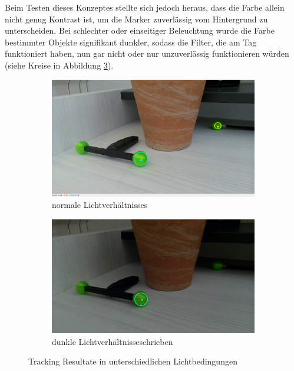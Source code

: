 \documentclass[12pt, ngerman]{article}
\begin{document}
Beim Testen dieses Konzeptes stellte sich jedoch heraus, dass die Farbe allein nicht genug Kontrast ist, um die Marker zuverlässig vom Hintergrund zu unterscheiden. Bei schlechter oder einseitiger Beleuchtung wurde die Farbe bestimmter Objekte signifikant dunkler, sodass die Filter, die am Tag funktioniert haben, nun gar nicht oder nur unzuverlässig funktionieren würden (siehe Kreise in Abbildung \ref{Abb: Lichtbedingungen}).  

\begin{figure}[htbp!]
  \centering
  \begin{subfigure}[t]{0.45\textwidth}
      \centering
      \includegraphics[width=\textwidth]{2d-normal.jpg}
      \caption{normale Lichtverhältnisses}
      \label{Abb: 2d-normal}
  \end{subfigure}
  \hfill
  \begin{subfigure}[t]{0.45\textwidth}
      \centering
      \includegraphics[width=\textwidth]{2d-normal-dark.jpg}
      \caption{dunkle Lichtverhältnisseschrieben}
      \label{Abb: 2d-normal-dunkel}
  \end{subfigure}
  \caption{Tracking Resultate in unterschiedlichen Lichtbedingungen}
  \label{Abb: Lichtbedingungen}
\end{figure}
\end{document}
